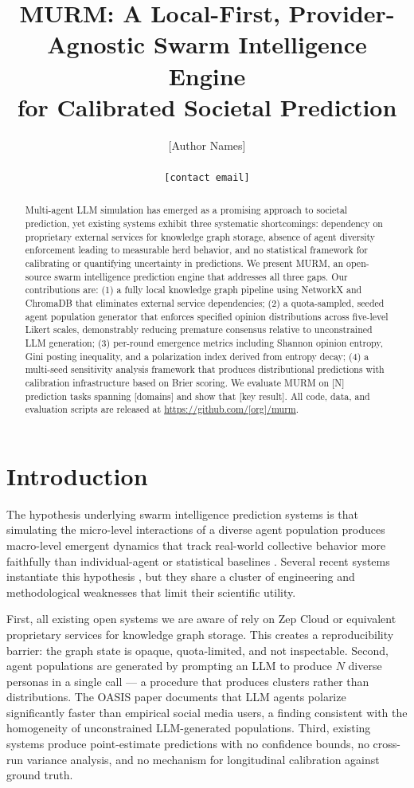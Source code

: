\documentclass[10pt,twocolumn]{article}
\title{MURM: A Local-First, Provider-Agnostic Swarm Intelligence Engine\\
for Calibrated Societal Prediction}
\author{
  [Author Names]\\
  [Institution]\\
  \texttt{[contact email]}
}
\date{}
\begin{document}
\maketitle

\begin{abstract}
Multi-agent LLM simulation has emerged as a promising approach to societal prediction, yet existing systems exhibit three systematic shortcomings: dependency on proprietary external services for knowledge graph storage, absence of agent diversity enforcement leading to measurable herd behavior, and no statistical framework for calibrating or quantifying uncertainty in predictions. We present \textsc{MURM}, an open-source swarm intelligence prediction engine that addresses all three gaps. Our contributions are: (1) a fully local knowledge graph pipeline using NetworkX and ChromaDB that eliminates external service dependencies; (2) a quota-sampled, seeded agent population generator that enforces specified opinion distributions across five-level Likert scales, demonstrably reducing premature consensus relative to unconstrained LLM generation; (3) per-round emergence metrics including Shannon opinion entropy, Gini posting inequality, and a polarization index derived from entropy decay; (4) a multi-seed sensitivity analysis framework that produces distributional predictions with calibration infrastructure based on Brier scoring. We evaluate \textsc{MURM} on [N] prediction tasks spanning [domains] and show that [key result]. All code, data, and evaluation scripts are released at \url{https://github.com/[org]/murm}.
\end{abstract}

\section{Introduction}

The hypothesis underlying swarm intelligence prediction systems is that simulating the micro-level interactions of a diverse agent population produces macro-level emergent dynamics that track real-world collective behavior more faithfully than individual-agent or statistical baselines \cite{park2023generative, gao2023s3, mou2024agentsocially}. Several recent systems instantiate this hypothesis \cite{mirofish2025, oasis2024}, but they share a cluster of engineering and methodological weaknesses that limit their scientific utility.

First, all existing open systems we are aware of rely on Zep Cloud or equivalent proprietary services for knowledge graph storage. This creates a reproducibility barrier: the graph state is opaque, quota-limited, and not inspectable. Second, agent populations are generated by prompting an LLM to produce $N$ diverse personas in a single call — a procedure that produces clusters rather than distributions. The OASIS paper \cite{oasis2024} documents that LLM agents polarize significantly faster than empirical social media users, a finding consistent with the homogeneity of unconstrained LLM-generated populations. Third, existing systems produce point-estimate predictions with no confidence bounds, no cross-run variance analysis, and no mechanism for longitudinal calibration against ground truth.
\end{document}
